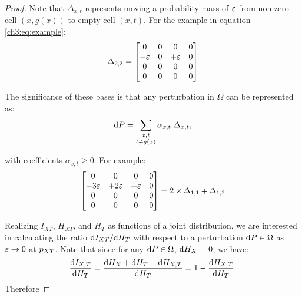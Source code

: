 \begin{proof}
Note that $ \Delta_{x,t} $ represents moving a probability mass of $\varepsilon$ from non-zero cell $ \left( x, g(x) \right)  $ to empty cell $ \left( x, t \right) $.
For the example in equation \eqref{ch3:eq:example}:
\begin{align*}
    \Delta_{2,3} = 
    \begin{bmatrix}
        0 & 0 & 0 & 0\\
        -\varepsilon & 0 & +\varepsilon & 0\\
        0 & 0 & 0 & 0\\
        0 & 0 & 0 & 0\\
    \end{bmatrix}
\end{align*}

The significance of these bases is that any perturbation in $\Omega$ can be represented as:
\begin{align}
    \dP = \sum_{\substack{ x, t \\ t \neq g(x) }} \alpha_{x,t} \ \Delta_{x, t},
\end{align}

with coefficients $ \alpha_{x,t} \geq 0 $. For example:
\[
    \begin{bmatrix}
        0 & 0 & 0 & 0 \\
        -3\varepsilon & +2\varepsilon & +\varepsilon & 0 \\
        0 & 0 & 0 & 0 \\
        0 & 0 & 0 & 0 \\
    \end{bmatrix}
    = 2 \times \Delta_{1, 1} + \Delta_{1, 2}
\]

Realizing  $I_{XT}$, $H_{XT}$, and $H_T$ as functions of a joint distribution, we are interested in calculating the ratio $ \text{d}{I_{XT}} / \text{d}{H_T}$ with respect to a perturbation $\text{d}{P}\in\Omega$ as $\varepsilon \to 0$ at $p_{XT}$. Note that since for any $\text{d}{P}\in\Omega$, $\text{d}{H_X}=0$, we have:
\begin{align*}
    \frac{\text{d}{I_{X,T}}}{\text{d}{H_T}} 
    = \frac{\text{d}{H_X} + \text{d}{H_T} - \text{d}{H_{X,T}}}{\text{d}{H_T}} 
    = 1 - \frac{\text{d}{H_{X,T}}}{\text{d}{H_T}}. 
\end{align*}
Therefore


\end{proof}
